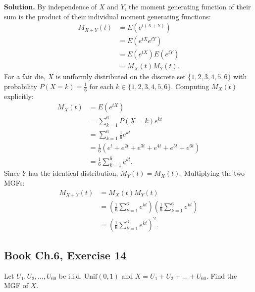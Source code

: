 \documentclass[11pt,a4paper]{article}
\begin{document}
\noindent \textbf{Solution.} By independence of $X$ and $Y$, the moment generating function of their sum is the product of their individual moment generating functions:
\begin{align*}
M_{X+Y}(t) &= E\left( e^{t(X+Y)} \right) \\
&= E\left( e^{tX} e^{tY} \right) \\
&= E\left( e^{tX} \right) E\left( e^{tY} \right) \\
&= M_X(t) M_Y(t).
\end{align*}
For a fair die, $X$ is uniformly distributed on the discrete set $\{1, 2, 3, 4, 5, 6\}$ with probability $P(X=k) = \frac{1}{6}$ for each $k \in \{1, 2, 3, 4, 5, 6\}$. Computing $M_X(t)$ explicitly:
\begin{align*}
M_X(t) &= E\left( e^{tX} \right) \\
&= \sum_{k=1}^{6} P(X=k) e^{kt} \\
&= \sum_{k=1}^{6} \frac{1}{6} e^{kt} \\
&= \frac{1}{6} \left( e^{t} + e^{2t} + e^{3t} + e^{4t} + e^{5t} + e^{6t} \right) \\
&= \frac{1}{6} \sum_{k=1}^{6} e^{kt}.
\end{align*}
Since $Y$ has the identical distribution, $M_Y(t) = M_X(t)$. Multiplying the two MGFs:
\begin{align*}
M_{X+Y}(t) &= M_X(t) M_Y(t) \\
&= \left( \frac{1}{6} \sum_{k=1}^{6} e^{kt} \right) \left( \frac{1}{6} \sum_{k=1}^{6} e^{kt} \right) \\
&= \left( \frac{1}{6} \sum_{k=1}^{6} e^{kt} \right)^2.
\end{align*}

\vspace{10pt}
\subsection{Book Ch.6, Exercise 14}
\begin{tcolorbox}[title={Book Ch.6, Exercise 14}]
Let $U_1, U_2, \dots, U_{60}$ be i.i.d. $\text{Unif}(0, 1)$ and $X = U_1 + U_2 + \dots + U_{60}$. Find the MGF of $X$.
\end{tcolorbox}
\end{document}
